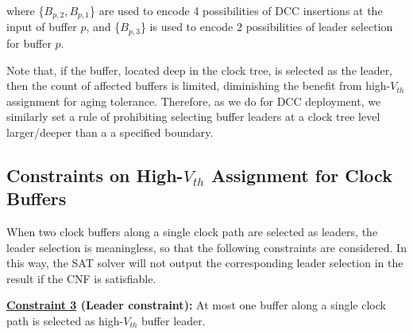 \noindent where \{$B_{p,2}, B_{p,1}$\} are used to encode 4 possibilities of DCC insertions at the input of buffer $p$, and \{$B_{p,3}$\} is used to encode 2 possibilities of leader selection for buffer $p$.

Note that, if the buffer, located deep in the clock tree, is selected as the leader, then the count of affected buffers is limited, diminishing the benefit from high-$V_{th}$ assignment for aging tolerance. Therefore, as we do for DCC deployment, we similarly set a rule of prohibiting selecting buffer leaders at a clock tree level larger/deeper than a a specified boundary.
\subsection{Constraints on High-$V_{th}$ Assignment for Clock Buffers}



When two clock buffers along a single clock path are selected as leaders, the leader selection is meaningless, so that the following constraints are considered. In this way, the SAT solver will not output the corresponding leader selection in the result if the CNF is satisfiable.

\noindent \textbf{\uline{Constraint 3} (Leader constraint):} At most one buffer along a single clock path is selected as high-$V_{th}$ buffer leader.

